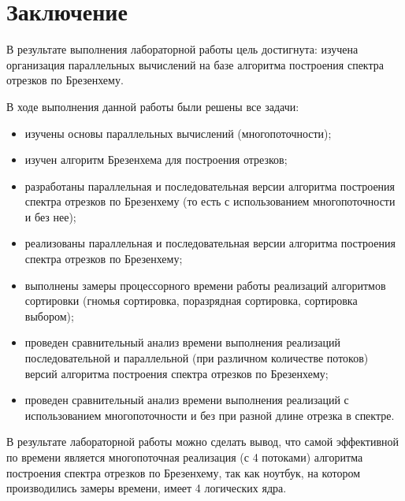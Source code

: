 \chapter*{Заключение}

В результате выполнения лабораторной работы цель достигнута: изучена организация параллельных вычислений на базе алгоритма построения спектра отрезков по Брезенхему.

В ходе выполнения данной работы были решены все задачи:

\begin{itemize}
    \item изучены основы параллельных вычислений (многопоточности);
    \item изучен алгоритм Брезенхема для построения отрезков;
	\item разработаны параллельная и последовательная версии алгоритма построения спектра отрезков по Брезенхему (то есть с использованием многопоточности и без нее);
	\item реализованы параллельная и последовательная версии алгоритма построения спектра отрезков по Брезенхему;
	\item выполнены замеры процессорного времени работы реализаций алгоритмов сортировки (гномья сортировка, поразрядная сортировка, сортировка выбором);
	\item проведен сравнительный анализ времени выполнения реализаций последовательной и параллельной (при различном количестве потоков) версий алгоритма построения спектра отрезков по Брезенхему;	
	\item проведен сравнительный анализ времени выполнения реализаций с использованием многопоточности и без при разной длине отрезка в спектре.
\end{itemize}

В результате лабораторной работы можно сделать вывод, что самой эффективной по времени является многопоточная реализация (с 4 потоками) алгоритма построения спектра отрезков по Брезенхему, так как ноутбук, на котором производились замеры времени, имеет 4 логических ядра.
